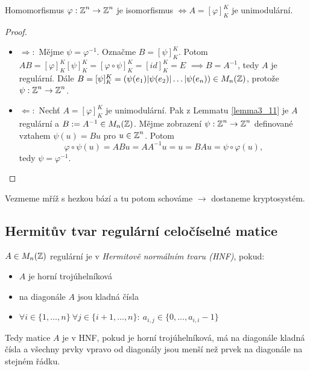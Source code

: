 \begin{claim}
    Homomorfismus $\varphi: \operatorname{\mathbb{Z}}^n \rightarrow \operatorname{\mathbb{Z}}^n$ je isomorfismus $\iff A = [\varphi]^K_K$ je unimodulární.
\end{claim}
\begin{proof}
\phantom{}
    \begin{itemize}[label={}]
        \item $\Rightarrow:$
    Mějme $\psi = \varphi^{-1}$. Označme $B = [\psi]^K_K$. Potom $AB = [\varphi]^K_K[\psi]^K_K = [\varphi \circ \psi]^K_K = [id]^K_K = E$
    $\implies B = A^{-1}$, tedy $A$ je regulární. Dále $B = [\psi]^K_K = (\psi(e_1)|\psi(e_2)| \dots | \psi(e_n)) \in M_n(\operatorname{\mathbb{Z}})$, protože $\psi: \operatorname{\mathbb{Z}}^n \rightarrow \operatorname{\mathbb{Z}}^n$.
    
        \item $\Leftarrow:$
    Nechť $A = [\varphi]^K_K$ je unimodulární. Pak z Lemmatu \ref{lemma3_11} je $A$ regulární a $B := A^{-1} \in M_n(\operatorname{\mathbb{Z}})$. Mějme zobrazení $\psi: \operatorname{\mathbb{Z}}^n \rightarrow \operatorname{\mathbb{Z}}^n$ definované vztahem $\psi(u) = Bu$ pro $u \in \operatorname{\mathbb{Z}}^n$. 
    Potom $$\varphi \circ \psi (u) = ABu = AA^{-1}u = u = BAu = \psi \circ \varphi (u),$$tedy $\psi = \varphi^{-1}$. 
    \end{itemize}
\end{proof}

\begin{note}
    Vezmeme mříž s hezkou bází a tu potom schováme $\rightarrow$ dostaneme kryptosystém.
\end{note}

\subsection{Hermitův tvar regulární celočíselné matice}
\begin{definition}
    $A \in M_n(\operatorname{\mathbb{Z}})$ regulární je v \emph{Hermitově normálním tvaru (HNF)}, pokud:
    \begin{itemize}
        \item $A$ je horní trojúhelníková
        \item na diagonále $A$ jsou kladná čísla
        \item $\forall i \in \{1, \dots, n\} \ \forall j \in \{i+1, \dots, n\}: \ a_{i,j} \in \{0, \dots, a_{i,i}-1\}$
    \end{itemize}
\end{definition}
\begin{note}
    Tedy matice $A$ je v HNF, pokud je horní trojúhelníková, má na diagonále kladná čísla a všechny prvky vpravo od diagonály jsou menší než prvek na diagonále na stejném řádku.
\end{note}


